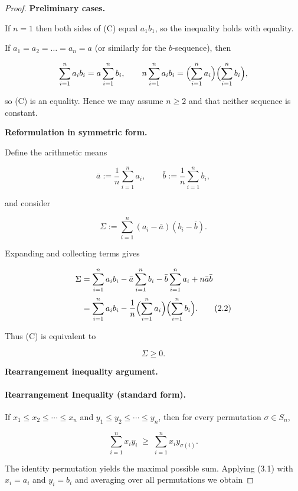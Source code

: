 \begin{proof}
\textbf{Preliminary cases.}  

If \(n=1\) then both sides of (C) equal \(a_{1}b_{1}\), so the inequality holds with
equality.  

If \(a_{1}=a_{2}= \dots =a_{n}=a\) (or similarly for the \(b\)-sequence), then  

\[
\sum_{i=1}^{n}a_{i}b_{i}=a\sum_{i=1}^{n}b_{i},
\qquad
n\sum_{i=1}^{n}a_{i}b_{i}
   =\Bigl(\sum_{i=1}^{n}a_{i}\Bigr)\Bigl(\sum_{i=1}^{n}b_{i}\Bigr),
\]

so (C) is an equality.  Hence we may assume \(n\ge 2\) and that neither
sequence is constant.

\medskip\noindent\textbf{Reformulation in symmetric form.}  

Define the arithmetic means  

\[
\bar a:=\frac1n\sum_{i=1}^{n}a_{i},
\qquad
\bar b:=\frac1n\sum_{i=1}^{n}b_{i},
\]

and consider  

\[
\Sigma:=\sum_{i=1}^{n}(a_{i}-\bar a)(b_{i}-\bar b). \tag{2.1}
\]

Expanding and collecting terms gives  

\begin{align*}
\Sigma
&=\sum_{i=1}^{n}a_{i}b_{i}
   -\bar a\sum_{i=1}^{n}b_{i}
   -\bar b\sum_{i=1}^{n}a_{i}
   +n\bar a\bar b \\[2pt]
&=\sum_{i=1}^{n}a_{i}b_{i}
   -\frac1n\Bigl(\sum_{i=1}^{n}a_{i}\Bigr)
           \Bigl(\sum_{i=1}^{n}b_{i}\Bigr). \tag{2.2}
\end{align*}

Thus (C) is equivalent to  

\[
\Sigma\ge 0. \tag{2.3}
\]

\medskip\noindent\textbf{Rearrangement inequality argument.}  

\paragraph{Rearrangement Inequality (standard form).}  
If \(x_{1}\le x_{2}\le\cdots\le x_{n}\) and \(y_{1}\le y_{2}\le\cdots\le y_{n}\),
then for every permutation \(\sigma\in S_{n}\),

\[
\sum_{i=1}^{n}x_{i}y_{i}\;\ge\;\sum_{i=1}^{n}x_{i}y_{\sigma(i)}. \tag{3.1}
\]

The identity permutation yields the maximal possible sum.  Applying (3.1) with
\(x_{i}=a_{i}\) and \(y_{i}=b_{i}\) and averaging over all permutations we obtain


\end{proof}
